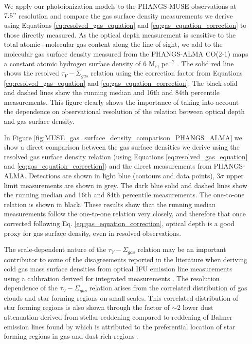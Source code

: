 \documentclass[fleqn,usenatbib]{mnras}
\begin{document}
We apply our photoionization models to the PHANGS-MUSE observations at $7.5"$ resolution and compare the gas surface density measurements we derive using Equations \ref{eq:resolved_gas_equation} and \ref{eq:gas_equation_correction} to those directly measured. As the optical depth measurement is sensitive to the total atomic$+$molecular gas content along the line of sight, we add to the molecular gas surface density measured from the PHANGS-ALMA CO(2-1) maps \citep{leroy2021} a constant atomic hydrogen surface density of 6 M$_{\odot}$ pc$^{-2}$ \citep{barrera-ballesteros2020}. The solid red line shows the resolved $\tau_V-\Sigma_{gas}$ relation using the correction factor from Equations \ref{eq:resolved_gas_equation} and \ref{eq:gas_equation_correction}. The black solid and dashed lines show the running median and 16th and 84th percentile measurements. This figure clearly shows the importance of taking into account the dependence on observational resolution of the relation between optical depth and gas surface density. 

In Figure \ref{fig:MUSE_gas_surface_density_comparison_PHANGS_ALMA} we show a direct comparison between the gas surface densities we derive using the resolved gas surface density relation (using Equations \ref{eq:resolved_gas_equation} and \ref{eq:gas_equation_correction}) and the direct measurements from PHANGS-ALMA. Detections are shown in light blue (contours and data points), 3$\sigma$ upper limit measurements are shown in grey. The dark blue solid and dashed lines show the running median and 16th and 84th percentile measurements. The one-to-one relation is shown in black. These results show that the running median measurements follow the one-to-one relation very closely, and therefore that once corrected following Eq. \ref{eq:gas_equation_correction}, optical depth is a good proxy for gas surface density, even in resolved observations. 

The scale-dependent nature of the $\tau_V - \Sigma_{gas}$ relation may be an important contributor to some of the disagreements reported in the literature when deriving cold gas mass surface densities from optical IFU emission line measurements using a calibration derived for integrated measurements \cite[e.g.][]{barrera-ballesteros2020}. The resolution dependence of the  $\tau_V - \Sigma_{gas}$ relation arises from the correlated distribution of gas clouds and star forming regions on small scales. This correlated distribution of star forming regions is also shown through the factor of $\sim$2 lower dust attenuation derived from stellar reddening compared to reddening of Balmer emission lines found by \cite{kreckel2013} which is attributed to the preferential location of star forming regions in gas and dust rich regions \citep{calzetti1994, calzetti2000, charlot2000, hao2011}.
\end{document}
